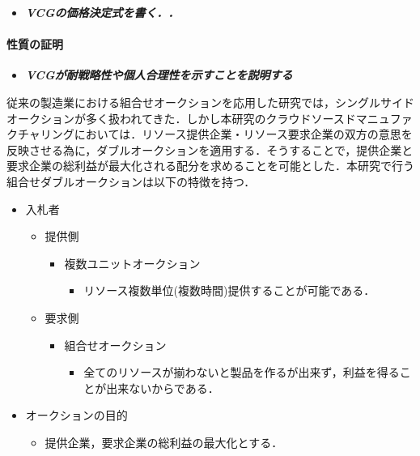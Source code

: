 \begin{itemize}
\tightlist
\item
  \textbf{\emph{VCGの価格決定式を書く．．}}
\end{itemize}

\hypertarget{ux6027ux8ceaux306eux8a3cux660e}{%
\paragraph{性質の証明}\label{ux6027ux8ceaux306eux8a3cux660e}}

\begin{itemize}
\tightlist
\item
  \textbf{\emph{VCGが耐戦略性や個人合理性を示すことを説明する}}
\end{itemize}

従来の製造業における組合せオークションを応用した研究では，シングルサイドオークションが多く扱われてきた．しかし本研究のクラウドソースドマニュファクチャリングにおいては．リソース提供企業・リソース要求企業の双方の意思を反映させる為に，ダブルオークションを適用する．そうすることで，提供企業と要求企業の総利益が最大化される配分を求めることを可能とした．本研究で行う組合せダブルオークションは以下の特徴を持つ．

\begin{itemize}
\tightlist
\item
  入札者

  \begin{itemize}
  \tightlist
  \item
    提供側

    \begin{itemize}
    \tightlist
    \item
      複数ユニットオークション

      \begin{itemize}
      \tightlist
      \item
        リソース複数単位(複数時間)提供することが可能である．
      \end{itemize}
    \end{itemize}
  \item
    要求側

    \begin{itemize}
    \tightlist
    \item
      組合せオークション

      \begin{itemize}
      \tightlist
      \item
        全てのリソースが揃わないと製品を作るが出来ず，利益を得ることが出来ないからである．
      \end{itemize}
    \end{itemize}
  \end{itemize}
\item
  オークションの目的

  \begin{itemize}
  \tightlist
  \item
    提供企業，要求企業の総利益の最大化とする．
  \end{itemize}
\end{itemize}

